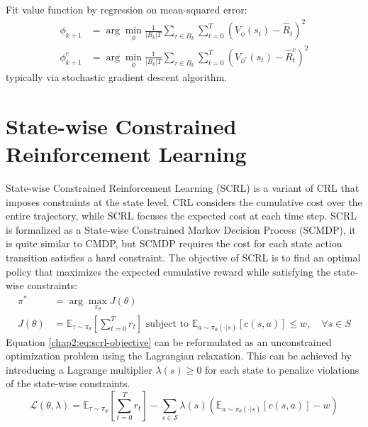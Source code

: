 \begin{algorithm}
{    
    Fit value function by regression on mean-squared error:
    \begin{equation*}
      \begin{aligned}
        \phi_{k + 1} &= \arg\min_\phi \frac{1}{|B_k|T} \sum_{\tau \in B_k} \sum^T_{t = 0} \left( V_\phi(s_t) - \hat{R}_t \right)^2 \\
        \phi^c_{k + 1} &= \arg\min_\phi \frac{1}{|B_k|T} \sum_{\tau \in B_k} \sum^T_{t = 0} \left( V_{\phi^c}(s_t) - \hat{R}^c_t \right)^2
      \end{aligned}
    \end{equation*}
    typically via stochastic gradient descent algorithm.
  }
\end{algorithm}

\section{State-wise Constrained Reinforcement Learning}

State-wise Constrained Reinforcement Learning (SCRL) is a variant of CRL that imposes constraints at the state level.
CRL considers the cumulative cost over the entire trajectory, while SCRL focuses the expected cost at each time step.
SCRL is formalized as a State-wise Constrained Markov Decision Process (SCMDP), it is quite similar to CMDP, but SCMDP requires the cost for each state action transition satisfies a hard constraint.
The objective of SCRL is to find an optimal policy that maximizes the expected cumulative reward while satisfying the state-wise constraints:
\begin{equation} \label{chap2:eq:scrl-objective}
  \begin{aligned}
    \pi^* &= \arg\max_{\pi_\theta} J(\theta) \\
    J(\theta) &= \mathbb{E}_{\tau \sim \pi_\theta} \left[ \sum^T_{t = 0} r_t \right] \text{ subject to } \mathbb{E}_{a \sim \pi_\theta(\cdot|s)}  [c(s, a)] \leq w, \quad \forall s \in S
  \end{aligned}
\end{equation}
Equation \eqref{chap2:eq:scrl-objective} can be reformulated as an unconstrained optimization problem using the Lagrangian relaxation.
This can be achieved by introducing a Lagrange multiplier $\lambda(s) \geq 0$ for each state to penalize violations of the state-wise constraints.
\begin{equation}
  \mathcal{L}(\theta, \lambda) = \mathbb{E}_{\tau \sim \pi_\theta}\left[ \sum^T_{t = 0} r_t \right] - \sum_{s \in \mathcal{S}} \lambda(s) \left( \mathbb{E}_{a \sim \pi_\theta(\cdot|s)}[c(s, a)] - w \right)
\end{equation}


